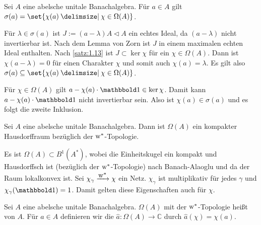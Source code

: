 \begin{satz}[label=satz:1.14]
	Sei $A$ eine abelsche unitale Banachalgebra. Für $a \in A$ gilt $\sigma(a)=\set{\chi(a) \given \chi \in \Omega(A)}$.
\end{satz}
\begin{beweis}
	Für $\lambda \in \sigma(a)$ ist $J := (a -\lambda)A \lhd A$ ein echtes Ideal, da $(a-\lambda)$ nicht invertierbar ist. Nach dem Lemma von Zorn ist $J$ in einem maximalen echten 
	Ideal enthalten. Nach \autoref{satz:1.13} ist $J \subset \ker \chi$ für ein $\chi \in \Omega(A)$. Dann ist $\chi(a- \lambda)=0$ für einen Charakter $\chi$ und somit auch 
	$\chi(a)=\lambda$. Es gilt also $\sigma(a) \subseteq \set{\chi(a) \given \chi \in \Omega(A)}$.
	
	Für $\chi \in \Omega(A)$ gilt $a- \chi(a) \cdot \ind \in \ker \chi$. Damit kann $a- \chi(a) \cdot \ind$ nicht invertierbar sein. Also ist $\chi(a) \in \sigma(a)$ und es folgt 
	die zweite Inklusion.
\end{beweis}

\begin{satz}
	Sei $A$ eine abelsche unitale Banachalgebra. Dann ist $\Omega(A)$ ein kompakter Hausdorffraum bezüglich der $\mathrm{w}^*$-Topologie.
\end{satz}
\begin{beweis}
	Es ist $\Omega(A) \subset B^1(A^*)$, wobei die Einheitskugel ein kompakt und Hausdorffsch ist (bezüglich der $\mathrm{w}^*$-Topologie) nach Banach-Alaoglu und da der Raum lokalkonvex 
	ist. Sei $\chi_\gamma \xrightarrow{\raisebox{-3pt}{$\w^*$}}\chi$ ein Netz. $\chi_\gamma$ ist multiplikativ für jedes $\gamma$ und $\chi_\gamma(\ind)=1$. Damit gelten diese Eigenschaften auch für 
	$\chi$.
\end{beweis}

\begin{definition}[{name=[Charakterspektrum und Gelfandtransformation]}]
	Sei $A$ eine abelsche unitale Banachalgebra. $\Omega(A)$ mit der $\mathrm{w}^*$-Topologie heißt  von $A$. Für $a \in A$ definieren wir
	die  $\hat{a} \colon \Omega(A) \to \mathbb{C}$ durch $\hat{a}(\chi)=\chi(a)$. 
\end{definition}

